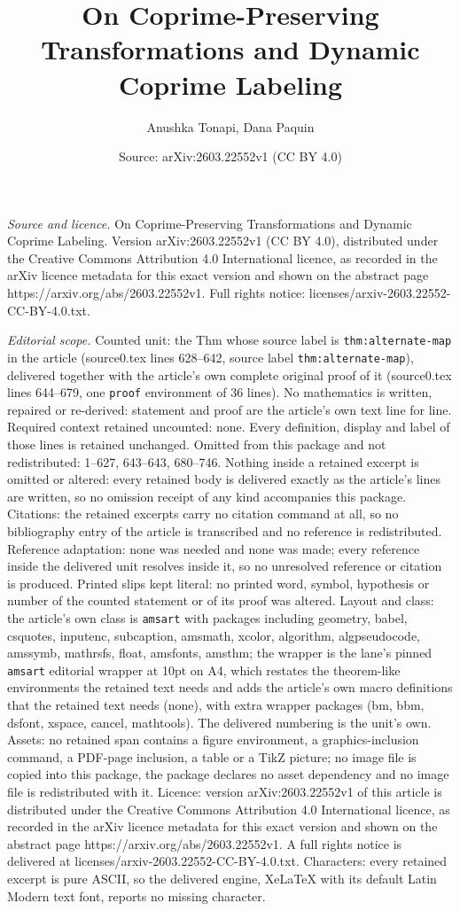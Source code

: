 \documentclass[10pt,a4paper]{amsart}
\title[On Coprime-Preserving Transformations and Dynamic Coprime La]{On Coprime-Preserving Transformations and Dynamic Coprime Labeling}
\author{Anushka Tonapi, Dana Paquin}
\date{Source: arXiv:2603.22552v1 (CC BY 4.0)}
\begin{document}
\maketitle

\noindent\emph{Source and licence.} On Coprime-Preserving Transformations and Dynamic Coprime Labeling. Version arXiv:2603.22552v1 (CC BY 4.0), distributed under the Creative Commons Attribution 4.0 International licence, as recorded in the arXiv licence metadata for this exact version and shown on the abstract page https://arxiv.org/abs/2603.22552v1. Full rights notice: licenses/arxiv-2603.22552-CC-BY-4.0.txt.\par\smallskip

\noindent\textit{Editorial scope.} Counted unit: the Thm whose source label is \texttt{thm:alternate-map} in the article (source0.tex lines 628--642, source label \texttt{thm:alternate-map}), delivered together with the article's own complete original proof of it (source0.tex lines 644--679, one \texttt{proof} environment of 36 lines). No mathematics is written, repaired or re-derived: statement and proof are the article's own text line for line. Required context retained uncounted: none. Every definition, display and label of those lines is retained unchanged. Omitted from this package and not redistributed: 1--627, 643--643, 680--746. Nothing inside a retained excerpt is omitted or altered: every retained body is delivered exactly as the article's lines are written, so no omission receipt of any kind accompanies this package. Citations: the retained excerpts carry no citation command at all, so no bibliography entry of the article is transcribed and no reference is redistributed. Reference adaptation: none was needed and none was made; every reference inside the delivered unit resolves inside it, so no unresolved reference or citation is produced. Printed slips kept literal: no printed word, symbol, hypothesis or number of the counted statement or of its proof was altered. Layout and class: the article's own class is \texttt{amsart} with packages including geometry, babel, csquotes, inputenc, subcaption, amsmath, xcolor, algorithm, algpseudocode, amssymb, mathrsfs, float, amsfonts, amsthm; the wrapper is the lane's pinned \texttt{amsart} editorial wrapper at 10pt on A4, which restates the theorem-like environments the retained text needs and adds the article's own macro definitions that the retained text needs (none), with extra wrapper packages (bm, bbm, dsfont, xspace, cancel, mathtools). The delivered numbering is the unit's own. Assets: no retained span contains a figure environment, a graphics-inclusion command, a PDF-page inclusion, a table or a TikZ picture; no image file is copied into this package, the package declares no asset dependency and no image file is redistributed with it. Licence: version arXiv:2603.22552v1 of this article is distributed under the Creative Commons Attribution 4.0 International licence, as recorded in the arXiv licence metadata for this exact version and shown on the abstract page https://arxiv.org/abs/2603.22552v1. A full rights notice is delivered at licenses/arxiv-2603.22552-CC-BY-4.0.txt. Characters: every retained excerpt is pure ASCII, so the delivered engine, XeLaTeX with its default Latin Modern text font, reports no missing character.
\end{document}
